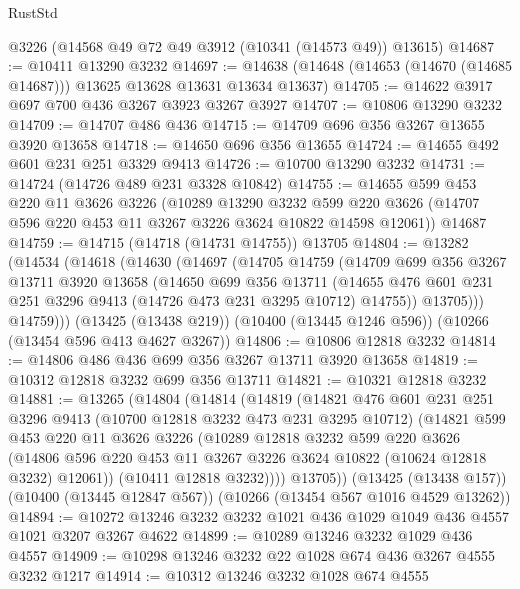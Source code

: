 \begin{lexlean}{RustStd}
\begin{coremodule}
    @3226
    (@14568 @49 @72 @49 @3912 (@10341 (@14573 @49)) @13615)
@14687 := @10411 @13290 @3232
@14697 := @14638 (@14648 (@14653 (@14670 (@14685 @14687))) @13625 @13628 @13631 @13634 @13637)
@14705 := @14622 @3917 @697 @700 @436 @3267 @3923 @3267 @3927
@14707 := @10806 @13290 @3232
@14709 := @14707 @486 @436
@14715 := @14709 @696 @356 @3267 @13655 @3920 @13658
@14718 := @14650 @696 @356 @13655
@14724 := @14655 @492 @601 @231 @251 @3329 @9413
@14726 := @10700 @13290 @3232
@14731 := @14724 (@14726 @489 @231 @3328 @10842)
@14755 := @14655
    @599
    @453
    @220
    @11
    @3626
    @3226
    (@10289
      @13290
      @3232
      @599
      @220
      @3626
      (@14707 @596 @220 @453 @11 @3267 @3226 @3624 @10822 @14598 @12061))
    @14687
@14759 := @14715 (@14718 (@14731 @14755)) @13705
@14804 := @13282
    (@14534
      (@14618
        (@14630
          (@14697
            (@14705
              @14759
              (@14709
                @699
                @356
                @3267
                @13711
                @3920
                @13658
                (@14650
                  @699
                  @356
                  @13711
                  (@14655 @476 @601 @231 @251 @3296 @9413 (@14726 @473 @231 @3295 @10712) @14755))
                @13705)))
          @14759)))
    (@13425 (@13438 @219))
    (@10400 (@13445 @1246 @596))
    (@10266 (@13454 @596 @413 @4627 @3267))
@14806 := @10806 @12818 @3232
@14814 := @14806 @486 @436 @699 @356 @3267 @13711 @3920 @13658
@14819 := @10312 @12818 @3232 @699 @356 @13711
@14821 := @10321 @12818 @3232
@14881 := @13265
    (@14804
      (@14814
        (@14819
          (@14821
            @476
            @601
            @231
            @251
            @3296
            @9413
            (@10700 @12818 @3232 @473 @231 @3295 @10712)
            (@14821
              @599
              @453
              @220
              @11
              @3626
              @3226
              (@10289
                @12818
                @3232
                @599
                @220
                @3626
                (@14806 @596 @220 @453 @11 @3267 @3226 @3624 @10822 (@10624 @12818 @3232) @12061))
              (@10411 @12818 @3232))))
        @13705))
    (@13425 (@13438 @157))
    (@10400 (@13445 @12847 @567))
    (@10266 (@13454 @567 @1016 @4529 @13262))
@14894 := @10272 @13246 @3232 @3232 @1021 @436 @1029 @1049 @436 @4557 @1021 @3207 @3267 @4622
@14899 := @10289 @13246 @3232 @1029 @436 @4557
@14909 := @10298 @13246 @3232 @22 @1028 @674 @436 @3267 @4555 @3232 @1217
@14914 := @10312 @13246 @3232 @1028 @674 @4555

\end{coremodule}
\end{lexlean}
